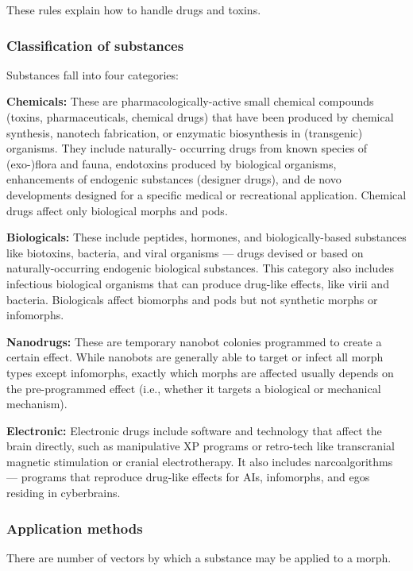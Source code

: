 These rules explain how to handle drugs and toxins.

\subsubsection{Classification of substances}

Substances fall into four categories:

\textbf{Chemicals:} These are pharmacologically-active small chemical compounds (toxins, pharmaceuticals, chemical drugs) that have been produced by chemical synthesis, nanotech fabrication, or enzymatic biosynthesis in (transgenic) organisms. They include naturally- occurring drugs from known species of (exo-)flora and fauna, endotoxins produced by biological organisms, enhancements of endogenic substances (designer drugs), and de novo developments designed for a specific medical or recreational application. Chemical drugs affect only biological morphs and pods.

\textbf{Biologicals:} These include peptides, hormones, and biologically-based substances like biotoxins, bacteria, and viral organisms --- drugs devised or based on naturally-occurring endogenic biological substances. This category also includes infectious biological organisms that can produce drug-like effects, like virii and bacteria. Biologicals affect biomorphs and pods but not synthetic morphs or infomorphs.

\textbf{Nanodrugs:} These are temporary nanobot colonies programmed to create a certain effect. While nanobots are generally able to target or infect all morph types except infomorphs, exactly which morphs are affected usually depends on the pre-programmed effect (i.e., whether it targets a biological or mechanical mechanism).

\textbf{Electronic:} Electronic drugs include software and technology that affect the brain directly, such as manipulative XP programs or retro-tech like transcranial magnetic stimulation or cranial electrotherapy. It also includes narcoalgorithms --- programs that reproduce drug-like effects for AIs, infomorphs, and egos residing in cyberbrains.

\subsubsection{Application methods}

There are number of vectors by which a substance may be applied to a morph.

